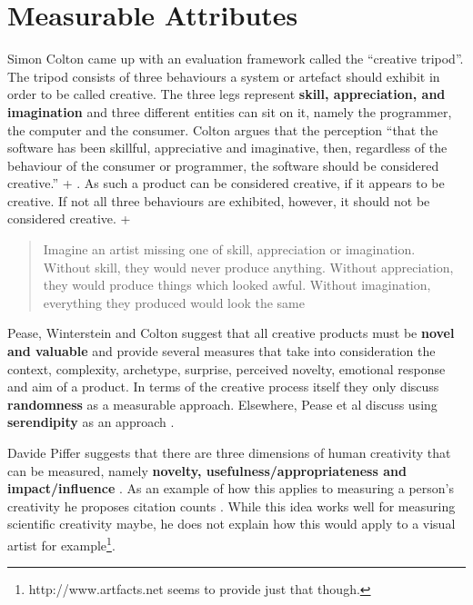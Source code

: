 \section{Measurable Attributes}

Simon Colton came up with an evaluation framework called the ``creative tripod''. The tripod consists of three behaviours a system or artefact should exhibit in order to be called creative. The three legs represent \textbf{skill, appreciation, and imagination} and three different entities can sit on it, namely the programmer, the computer and the consumer. Colton argues that the perception ``that the software has been skillful, appreciative and imaginative, then, regardless of the behaviour of the consumer or programmer, the software should be considered creative.'' \citeyear[p.5]{Colton2008a} + \citeyear[p.5]{Colton2008}. As such a product can be considered creative, if it appears to be creative. If not all three behaviours are exhibited, however, it should not be considered creative. \parencite[p.5]{Colton2008a} + \parencite[p.5]{Colton2008}

\begin{quote}
  Imagine an artist missing one of skill, appreciation or imagination. Without skill, they would never produce anything. Without appreciation, they would produce things which looked awful. Without imagination, everything they produced would look the same \parencite{Colton2008a}
\end{quote}

Pease, Winterstein and Colton suggest that all creative products must be \textbf{novel and valuable} \citeyear[p.1]{Pease2001} and provide several measures that take into consideration the context, complexity, archetype, surprise, perceived novelty, emotional response and aim of a product. In terms of the creative process itself they only discuss \textbf{randomness} as a measurable approach. Elsewhere, Pease et al discuss using \textbf{serendipity} as an approach \citeyear{Pease2013}.

Davide Piffer suggests that there are three dimensions of human creativity that can be measured, namely \textbf{novelty, usefulness/appropriateness and impact/influence} \citeyear[p.258-259]{Piffer2012}. As an example of how this applies to measuring a person’s creativity he proposes citation counts \parencite[p.261]{Piffer2012}. While this idea works well for measuring scientific creativity maybe, he does not explain how this would apply to a visual artist for example\footnote{http://www.artfacts.net seems to provide just that though.}.

